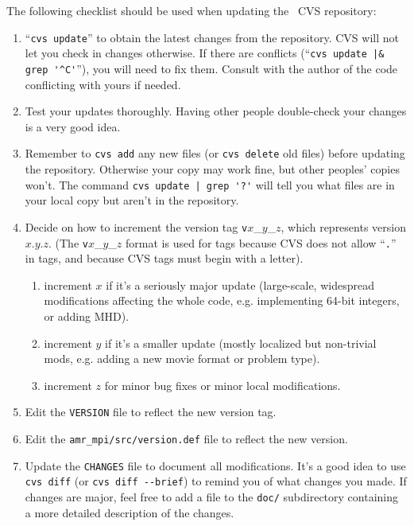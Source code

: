 \documentclass{article}
\begin{document}
The following checklist should be used when updating the \cello\ CVS repository:

\begin{enumerate}
   \item ``\verb+cvs update+'' to obtain the latest changes from the repository.
      CVS will not let you check in changes otherwise.  If there are
      conflicts (``\verb+cvs update |& grep '^C'+''), you will need to fix
      them.  Consult with the author of the code conflicting with
      yours if needed.

   \item Test your updates thoroughly.  Having other people double-check
      your changes is a very good idea.

   \item Remember to \verb+cvs add+ any new files (or \verb+cvs delete+
    old files) before updating the repository.  Otherwise your
   copy may work fine, but other peoples' copies won't.  The command
   \verb+cvs update | grep '?'+ will tell you what files are in your
   local copy but aren't in the repository.

   \item Decide on how to increment the version tag
   \texttt{v}$x$\_$y$\_$z$, which represents version $x$.$y$.$z$.  (The
   \texttt{v}$x$\_$y$\_$z$ format is used for tags because CVS does not
   allow ``\texttt{.}'' in tags, and because CVS tags must begin with a letter).

\begin{enumerate}
      \item increment $x$ if it's a seriously major update (large-scale,
          widespread modifications affecting the whole code, e.g. 
          implementing 64-bit integers, or adding MHD).
      \item increment $y$ if it's a smaller update (mostly localized but 
          non-trivial mods, e.g. adding a new movie format or problem type).
      \item increment $z$ for minor bug fixes or minor local modifications.
\end{enumerate}

   \item Edit the \texttt{VERSION} file to reflect the new version tag.

   \item Edit the \texttt{amr\_mpi/src/version.def} file to reflect the new
      version.

   \item Update the \texttt{CHANGES} file to document all modifications.
   It's a good idea to use \texttt{cvs diff} (or \verb+cvs diff --brief+) to remind you of what changes you made.  If changes are
   major, feel free to add a file to the \texttt{doc/} subdirectory
   containing a more detailed description of the changes.


\end{enumerate}
\end{document}
